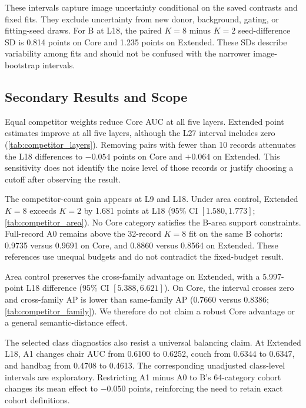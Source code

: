 These intervals capture image uncertainty conditional on the saved
contrasts and fixed fits. They exclude uncertainty from new donor,
background, gating, or fitting-seed draws. For B at L18, the paired
\(K=8\) minus \(K=2\) seed-difference SD is 0.814 points on Core
and 1.235 points on Extended. These SDs describe variability among fits
and should not be confused with the narrower image-bootstrap intervals.






\subsection{Secondary Results and Scope}

Equal competitor weights reduce Core AUC at all five layers. Extended
point estimates improve at all five layers, although the L27 interval
includes zero (\cref{tab:competitor_layers}). Removing pairs with fewer
than 10 records attenuates the L18 differences to \(-0.054\) points
on Core and \(+0.064\) on Extended. This sensitivity does not identify
the noise level of those records or justify choosing a cutoff after
observing the result.

The competitor-count gain appears at L9 and L18. Under area control,
Extended \(K=8\) exceeds \(K=2\) by 1.681 points at L18
(95\% CI \([1.580,1.773]\); \cref{tab:competitor_area}). No Core
category satisfies the B-area support constraints. Full-record A0 remains
above the 32-record \(K=8\) fit on the same B cohorts: 0.9735 versus
0.9691 on Core, and 0.8860 versus 0.8564 on Extended. These references
use unequal budgets and do not contradict the fixed-budget result.

Area control preserves the cross-family advantage on Extended, with a
5.997-point L18 difference (95\% CI \([5.388,6.621]\)). On Core,
the interval crosses zero and cross-family AP is lower than same-family
AP (0.7660 versus 0.8386; \cref{tab:competitor_family}). We therefore do
not claim a robust Core advantage or a general semantic-distance effect.

The selected class diagnostics also resist a universal balancing claim.
At Extended L18, A1 changes chair AUC from 0.6100 to 0.6252, couch from
0.6344 to 0.6347, and handbag from 0.4708 to 0.4613. The corresponding
unadjusted class-level intervals are exploratory. Restricting A1 minus A0
to B's 64-category cohort changes its mean effect to \(-0.050\) points,
reinforcing the need to retain exact cohort definitions.

